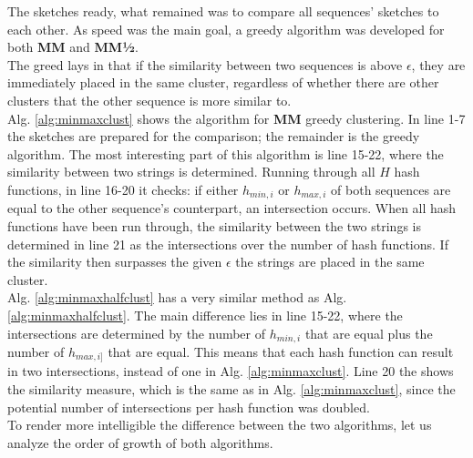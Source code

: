 \documentclass[../../main.tex]{subfiles}
\begin{document}
The sketches ready, what remained was to compare all sequences' sketches to each other. As speed was the main goal, a greedy algorithm was developed for both {\bf MM} and {\bf MM½}.\\

The greed lays in that if the similarity between two sequences is above $\epsilon$, they are immediately placed in the same cluster, regardless of whether there are other clusters that the other sequence is more similar to. \\

Alg. \ref{alg:minmaxclust} shows the algorithm for {\bf MM} greedy clustering. In line 1-7 the sketches are prepared for the comparison; the remainder is the greedy algorithm. The most interesting part of this algorithm is line 15-22, where the similarity between two strings is determined. Running through all $H$ hash functions, in line 16-20 it checks: if either $h_{min,i}$ or $h_{max,i}$ of both sequences are equal to the other sequence's counterpart, an intersection occurs. When all hash functions have been run through, the similarity between the two strings is determined in line 21 as the intersections over the number of hash functions. If the similarity then surpasses the given $\epsilon$ the strings are placed in the same cluster.\\

Alg. \ref{alg:minmaxhalfclust} has a very similar method as Alg. \ref{alg:minmaxhalfclust}. The main difference lies in line 15-22, where the intersections are determined by the number of $h_{min,i}$ that are equal plus the number of $h_{max,i]}$ that are equal. This means that each hash function can result in two intersections, instead of one in Alg. \ref{alg:minmaxclust}. Line 20 the shows the similarity measure, which is the same as in Alg. \ref{alg:minmaxclust}, since the potential number of intersections per hash function was doubled.\\

To render more intelligible the difference between the two algorithms, let us analyze the order of growth of both algorithms.
\end{document}
